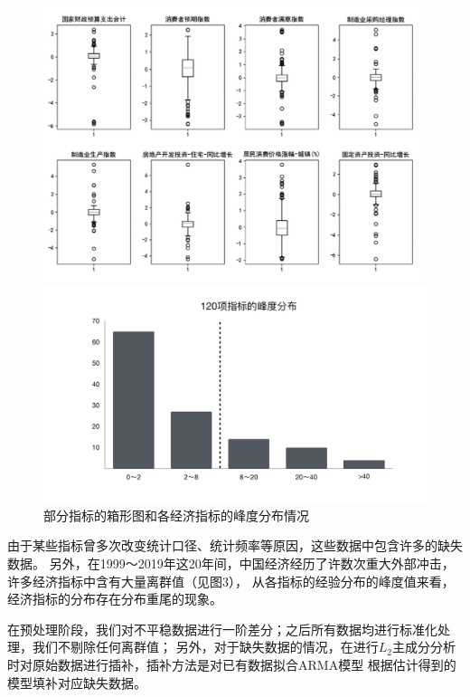 \begin{figure}[H]
    \begin{minipage}[t]{1\textwidth}
    \centering
    \includegraphics[width=11cm]{pics/some-indexes.jpg}
    \end{minipage}
    \begin{minipage}[t]{1\textwidth}
    \centering
    \includegraphics[width=12cm]{pics/chapter2/skew.pdf}
    \end{minipage}
    \caption{\small 部分指标的箱形图和各经济指标的峰度分布情况}
\end{figure}

由于某些指标曾多次改变统计口径、统计频率等原因，这些数据中包含许多的缺失数据。
另外，在1999～2019年这20年间，中国经济经历了许数次重大外部冲击，许多经济指标中含有大量离群值（见图3），
从各指标的经验分布的峰度值来看，经济指标的分布存在分布重尾的现象。

在预处理阶段，我们对不平稳数据进行一阶差分；之后所有数据均进行标准化处理，我们不剔除任何离群值；
另外，对于缺失数据的情况，在进行$L_2$主成分分析时对原始数据进行插补，插补方法是对已有数据拟合ARMA模型
根据估计得到的模型填补对应缺失数据。

